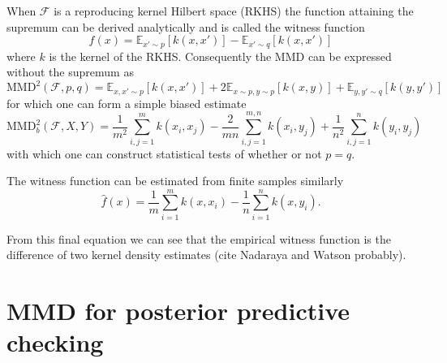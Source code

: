 \documentclass{article} %
\begin{document}
When $\mathcal{F}$ is a reproducing kernel Hilbert space (RKHS) the function attaining the supremum can be derived analytically and is called the witness function
\begin{equation}
f(x) = \mathbb{E}_{x'\sim p}[k(x,x')] - \mathbb{E}_{x'\sim q}[k(x,x')]
\end{equation}
where $k$ is the kernel of the RKHS.
Consequently the MMD can be expressed without the supremum as
\begin{equation}
  \textrm{MMD}^2(\mathcal{F},p,q) = \mathbb{E}_{x,x'\sim p}[k(x,x')] + 2\mathbb{E}_{x\sim p,y\sim p}[k(x,y)] + \mathbb{E}_{y,y'\sim q}[k(y,y')]
\end{equation}
for which one can form a simple biased estimate
\begin{equation}
  \textrm{MMD}_b^2(\mathcal{F},X,Y) = \frac{1}{m^2}\sum_{i,j=1}^{m}k(x_i,x_j) - \frac{2}{mn}\sum_{i,j=1}^{m,n}k(x_i,y_j) + \frac{1}{n^2}\sum_{i,j=1}^{n}k(y_i,y_j)
\end{equation}
with which one can construct statistical tests of whether or not $p=q$.

The witness function can be estimated from finite samples similarly
\begin{equation}
\hat{f}(x) = \frac{1}{m}\sum_{i=1}^{m}k(x,x_i) - \frac{1}{n}\sum_{i=1}^{n}k(x,y_i).
\end{equation}

From this final equation we can see that the empirical witness function is the difference of two kernel density estimates (cite Nadaraya and Watson probably).

\section{MMD for posterior predictive checking}
\end{document}
